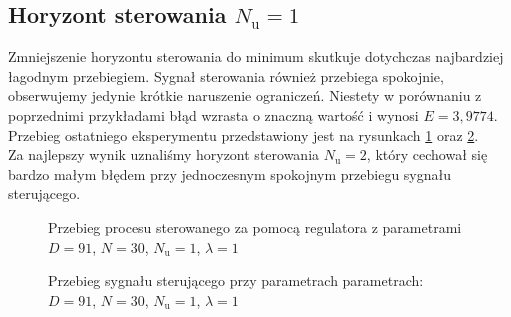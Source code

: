 \subsection{Horyzont sterowania $N_{\mathrm{u}} = 1$}
Zmniejszenie horyzontu sterowania do minimum skutkuje dotychczas najbardziej łagodnym przebiegiem. Sygnał sterowania również przebiega spokojnie, obserwujemy jedynie krótkie naruszenie ograniczeń. Niestety w porównaniu z poprzednimi przykładami błąd wzrasta o znaczną wartość i wynosi $E = 3,9774$. Przebieg ostatniego eksperymentu przedstawiony jest na rysunkach \ref{dmc_Nu_1_y} oraz \ref{dmc_Nu_1_u}.\\
\indent{} Za najlepszy wynik uznaliśmy horyzont sterowania $N_{\mathrm{u}} = 2$, który cechował się bardzo małym błędem przy jednoczesnym spokojnym przebiegu sygnału sterującego.
\\
\begin{figure}[b]
    \centering
    \caption{Przebieg procesu sterowanego za pomocą regulatora z parametrami $D = 91$, $N = 30$, $N_{\mathrm{u}} = 1$, $\lambda = 1$}
    \label{dmc_Nu_1_y}
\end{figure}

\begin{figure}[b]
    \centering
    \caption{Przebieg sygnału sterującego przy parametrach parametrach: $D = 91$, $N = 30$, $N_{\mathrm{u}} = 1$, $\lambda = 1$}
    \label{dmc_Nu_1_u}
\end{figure}

